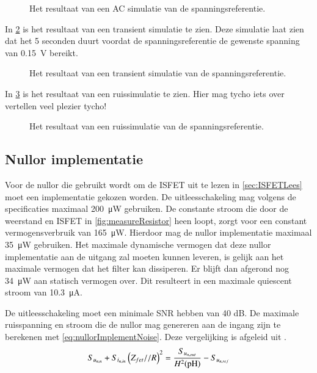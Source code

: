 \begin{figure}[!htbp]
    \centering
    \pgfplotsset{width=0.7\textwidth}
    
    \caption{Het resultaat van een AC simulatie van de spanningsreferentie.}
    \label{fig:referenceSimFreq}
\end{figure}

In \cref{fig:referenceSimTrans} is het resultaat van een transient simulatie te zien. Deze simulatie laat zien dat het 5 seconden duurt voordat de spanningsreferentie de gewenste spanning van \qty{0.15}{\volt} bereikt.
\begin{figure}[!htbp]
    \centering
    \pgfplotsset{width=0.7\textwidth}
    
    \caption{Het resultaat van een transient simulatie van de spanningsreferentie.}
    \label{fig:referenceSimTrans}
\end{figure}

In \cref{fig:referenceSimNoise} is het resultaat van een ruissimulatie te zien. Hier mag tycho iets over vertellen veel plezier tycho!%
\begin{figure}[!htbp]
    \centering
    \pgfplotsset{width=0.7\textwidth}
    
    \caption{Het resultaat van een ruissimulatie van de spanningsreferentie.}
    \label{fig:referenceSimNoise}
\end{figure}


\subsection{Nullor implementatie}
Voor de nullor die gebruikt wordt om de ISFET uit te lezen in \cref{sec:ISFETLees} moet een implementatie gekozen worden. De uitleesschakeling mag volgens de specificaties maximaal \qty{200}{\micro\watt}  gebruiken. De constante stroom die door de weerstand en ISFET in \cref{fig:measureResistor} heen loopt, zorgt voor een constant vermogensverbruik van \qty{165}{\micro\watt}. Hierdoor mag de nullor implementatie maximaal \qty{35}{\micro\watt} gebruiken. Het maximale dynamische vermogen dat deze nullor implementatie aan de uitgang zal moeten kunnen leveren, is gelijk aan het maximale vermogen dat het filter kan dissiperen. Er blijft dan afgerond nog \qty{34}{\micro\watt} aan statisch vermogen over. Dit resulteert in een maximale quiescent stroom van \qty{10.3}{\micro\ampere}.

De uitleesschakeling moet een minimale SNR hebben van 40 dB. De maximale ruisspanning en stroom die de nullor mag genereren aan de ingang zijn te berekenen met \cref{eq:nullorImplementNoise}. Deze vergelijking is afgeleid uit .
\begin{equation} \label{eq:nullorImplementNoise}
    S_{u_{{n,n}}} + S_{i_{{n,in}}}\left(Z_{fet} // R\right)^2 = \frac{S_{u_{{n,out}}}}{H^2(\mathrm{pH})} - S_{u_{{n,ref}}}
\end{equation}

